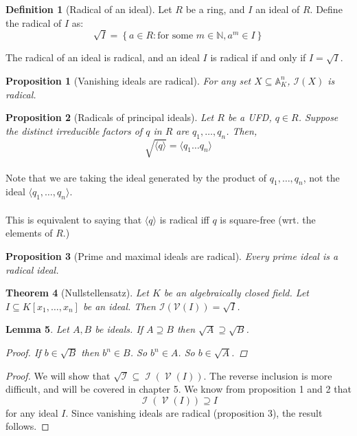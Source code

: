 \documentclass[12pt, a4paper]{article}
\newtheorem{theorem}{Theorem}
\newtheorem{lemma}[theorem]{Lemma}
\newtheorem{proposition}[theorem]{Proposition}
\theoremstyle{definition}
\newtheorem{definition}{Definition}
\DeclareMathOperator{\CI}{\mathcal{I}}
\DeclareMathOperator{\CV}{\mathcal{V}}
\begin{document}
\begin{definition}[Radical of an ideal]
Let $R$ be a ring, and $I$ an ideal of $R$. Define the radical of $I$ as:
$$
\sqrt I = \left\{
a \in R : \text{for some } m \in \mathbb{N}, a^m \in I
\right\}
$$
\end{definition}
The radical of an ideal is radical, and an ideal $I$ is radical if and only if $I = \sqrt I$.
\begin{proposition}[Vanishing ideals are radical]
	For any set $X \subseteq \mathbb{A}^n_K$, $\mathcal I (X)$ is radical.
\end{proposition}
\begin{proposition}[Radicals of principal ideals]
	Let $R$ be a UFD, $q \in R$. Suppose the distinct irreducible factors of $q$ in $R$ are $q_1, \dots, q_n$. Then, $$
	\sqrt{\langle q \rangle} = \langle q_1 \dots q_n \rangle
	$$
\end{proposition}
\paragraph{}Note that we are taking the ideal generated by the product of $q_1, \dots, q_n$, not the ideal $\langle q_1, \dots, q_n\rangle$.
\paragraph{}This is equivalent to saying that $\langle q \rangle$ is radical iff $q$ is square-free (wrt. the elements of $R$.)

\begin{proposition}[Prime and maximal ideals are radical]
	Every prime ideal is a radical ideal.
\end{proposition}

\begin{theorem}[Nullstellensatz]
   Let $K$ be an algebraically closed field. Let $I \subseteq K[x_1, \ldots, x_n]$ be an ideal. Then $\mathcal I(\mathcal V(I)) = \sqrt{I}$.
 \end{theorem}
   \begin{lemma}
     Let $A,B$ be ideals. If $A \supseteq B$ then $\sqrt{A} \supseteq \sqrt{B}$.
     \begin{proof}
       If $b\in \sqrt{B}$ then $b^n \in B$. So $b^n \in A$. So $b\in\sqrt{A}$.
     \end{proof}
   \end{lemma}
 \begin{proof}
   We will show that $\sqrt{\CI} \subseteq \CI(\CV(I))$.
   The reverse inclusion is more difficult, and will be covered in chapter 5.
   We know from proposition 1 and 2 that
   $$ \CI(\CV(I)) \supseteq I  $$
   for any ideal $I$. Since vanishing ideals are radical (proposition 3), the result follows.  
\end{proof}
 
\end{document}

